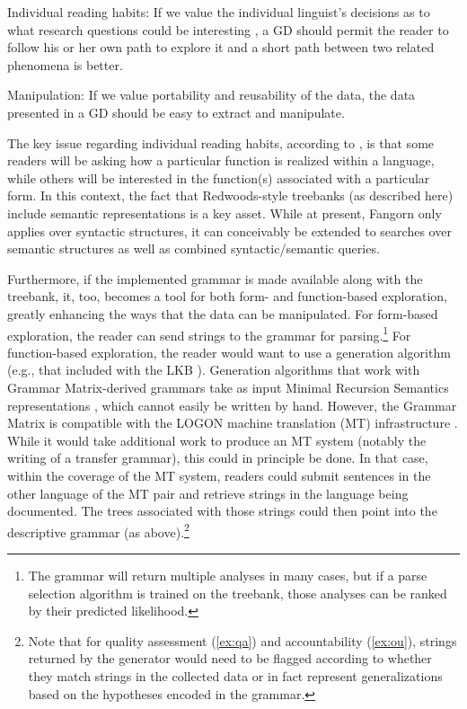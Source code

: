 \begin{exe}
\ex\label{ex:ff} {\sc Individual reading habits:} If we value the individual
linguist's decisions as to what research questions could be
interesting \cite[402]{Rice:06}, a GD should permit the reader to
follow his or her own path to explore it and a short path between
two related phenomena is better.
\end{exe}

\begin{exe}
\ex\label{ex:mn} {\sc Manipulation:} If we value portability and reusability of
the data, the data presented in a GD should be easy to extract and
manipulate.
\end{exe}


The key issue regarding individual reading habits, according to
, is that some readers will be asking how a
particular function is realized within a language, while others will
be interested in the function(s) associated with a particular form.
In this context, the fact that Redwoods-style treebanks (as described
here) include semantic representations is a key asset.  While at
present, Fangorn only applies over syntactic structures, it
can conceivably be extended to searches over semantic structures as
well as combined syntactic/semantic queries.  

Furthermore, if the implemented grammar is made available along with the
treebank, it, too, becomes a tool for both form- and function-based
exploration, greatly enhancing the ways that the data can be
manipulated.  For form-based exploration, the reader can send strings to
the grammar for parsing.\footnote{The grammar will return multiple
  analyses in many cases, but if a parse selection algorithm
  is trained on the treebank, those analyses can be ranked
  by their predicted likelihood.}  For function-based exploration, the
reader would want to use a generation algorithm (e.g., that included
with the LKB \citep{Car:Cop:Fli:99}).  Generation algorithms that
work with Grammar Matrix-derived grammars take as input Minimal
Recursion Semantics representations \citep{Cop:Fli:Pol:Sag:05}, which
cannot easily be written by hand.  However, the Grammar Matrix is
compatible with the LOGON machine translation (MT) infrastructure
\citep{Lon:Oep:Ber:04}.  While it would take additional work to produce
an MT system (notably the writing of a transfer grammar), this could in
principle be done.  In that case, within the coverage of the MT system,
readers could submit sentences in the other language of the MT pair and
retrieve strings in the language being documented.  The trees associated
with those strings could then point into the descriptive grammar (as
above).\footnote{Note that for {\sc quality assessment} (\ref{ex:qa})
  and {\sc accountability} (\ref{ex:ou}), strings returned by the
  generator would need to be flagged according to whether they match
  strings in the collected data or in fact represent generalizations
  based on the hypotheses encoded in the grammar.}


